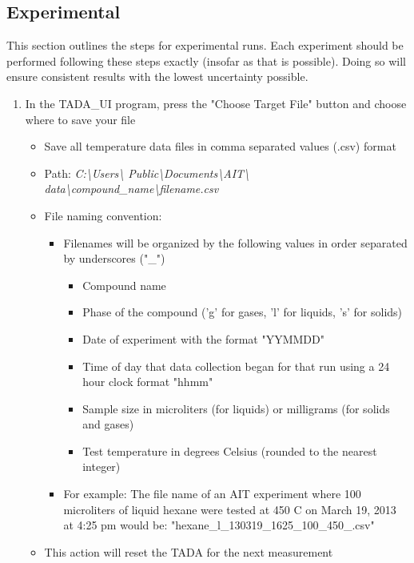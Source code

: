 \documentclass[letterpaper,11pt]{article}
\begin{document}
\subsection{Experimental}
This section outlines the steps for experimental runs. Each experiment should be
performed following these steps exactly (insofar as that is possible). Doing so
will ensure consistent results with the lowest uncertainty possible.
    \begin{enumerate}
  
    \item In the TADA\_UI program, press the "Choose Target File" button and 
        choose where to save your file
        \begin{itemize}
        \item Save all temperature data files in comma separated values (.csv) 
            format
        \item Path: \textit{C:\textbackslash Users\textbackslash 
            Public\textbackslash Documents\textbackslash AIT\textbackslash 
            data\textbackslash compound\_name\textbackslash filename.csv}
        \item File naming convention: 
            \begin{itemize}
            \item Filenames will be organized by the following values in order 
                separated by underscores ("\_")
                    \begin{itemize}
                    \item Compound name
                    \item Phase of the compound ('g' for gases, 'l' for liquids,
                        's' for solids)
                    \item Date of experiment with the format "YYMMDD"
                    \item Time of day that data collection began for that run
                        using a 24 hour clock format "hhmm"
                    \item Sample size in microliters (for liquids) or milligrams
                        (for solids and gases)
                    \item Test temperature in degrees Celsius (rounded to the 
                        nearest integer)
                    \end{itemize}
                    
            \item For example: The file name of an AIT experiment where 100 
                microliters of liquid hexane were tested at 450 \degree C on 
                March 19, 2013 at 4:25 pm would be: \newline
                "hexane\_l\_130319\_1625\_100\_450\_.csv"
            \end{itemize}    
        \item This action will reset the TADA for the next measurement        
        \end{itemize}
    

\end{enumerate}
\end{document}
